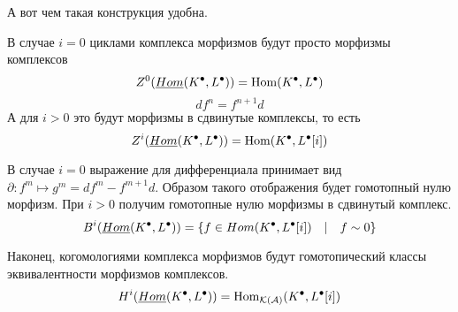 \documentclass[../main.tex]{subfiles}
\begin{document}
А вот чем такая конструкция удобна.
\begin{to_com}
    В случае $i=0$ циклами комплекса морфизмов будут просто морфизмы комплексов 
    \[
        Z^0 (\underline{Hom}(K^\bullet, L^\bullet)) = \operatorname{Hom}(K^\bullet, L^\bullet)
    \]
    \[
    df^n = f^{n+1}d
    \]
    А для $i>0$ это будут морфизмы в сдвинутые комплексы, то есть 
    \[
    Z^i (\underline{Hom}(K^\bullet, L^\bullet)) = \operatorname{Hom}(K^\bullet, L^\bullet[i])
    \]
\end{to_com}
\begin{to_com}
    В случае $i=0$ выражение для дифференциала принимает вид $\partial\colon f^m\mapsto g^m = df^m - f^{m+1}d$. Образом такого отображения будет гомотопный нулю морфизм. При $i>0$ получим гомотопные нулю морфизмы в сдвинутый комплекс.
    \[
        B^i (\underline{Hom}(K^\bullet, L^\bullet)) = \lbrace f\in Hom(K^\bullet, L^\bullet[i])\quad|\quad f\sim 0 \rbrace
    \]
\end{to_com}
\begin{to_com}\label{cohomology_comp_mor}
Наконец, когомологиями комплекса морфизмов будут гомотопический классы эквивалентности морфизмов комплексов.
\[
H^i (\underline{Hom}(K^\bullet, L^\bullet)) = \operatorname{Hom}_{\mathcal{K(A)}}(K^\bullet, L^\bullet[i])
\]
\end{to_com}
\end{document}
